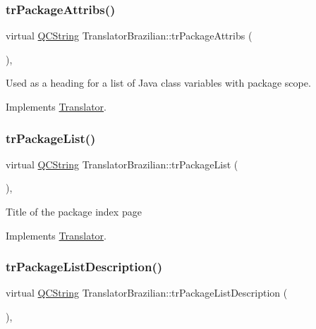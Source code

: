 \subsubsection{\texorpdfstring{trPackageAttribs()}{trPackageAttribs()}}
{\footnotesize\ttfamily virtual \mbox{\hyperlink{class_q_c_string}{Q\+C\+String}} Translator\+Brazilian\+::tr\+Package\+Attribs (\begin{DoxyParamCaption}{ }\end{DoxyParamCaption})\hspace{0.3cm}{\ttfamily [inline]}, {\ttfamily [virtual]}}

Used as a heading for a list of Java class variables with package scope. 

Implements \mbox{\hyperlink{class_translator}{Translator}}.

\mbox{\label{class_translator_brazilian_a4ec0d1f6b48b79cf401a114870b063f1}} 
\subsubsection{\texorpdfstring{trPackageList()}{trPackageList()}}
{\footnotesize\ttfamily virtual \mbox{\hyperlink{class_q_c_string}{Q\+C\+String}} Translator\+Brazilian\+::tr\+Package\+List (\begin{DoxyParamCaption}{ }\end{DoxyParamCaption})\hspace{0.3cm}{\ttfamily [inline]}, {\ttfamily [virtual]}}

Title of the package index page 

Implements \mbox{\hyperlink{class_translator}{Translator}}.

\mbox{\label{class_translator_brazilian_a759f7a54c5b6d5254aeae1473818e818}} 
\subsubsection{\texorpdfstring{trPackageListDescription()}{trPackageListDescription()}}
{\footnotesize\ttfamily virtual \mbox{\hyperlink{class_q_c_string}{Q\+C\+String}} Translator\+Brazilian\+::tr\+Package\+List\+Description (\begin{DoxyParamCaption}{ }\end{DoxyParamCaption})\hspace{0.3cm}{\ttfamily [inline]}, {\ttfamily [virtual]}}

